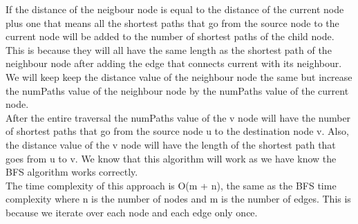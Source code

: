 \documentclass[12pt]{article}
\begin{document}
If the distance of the neigbour node is equal to the distance of the current node plus one that means all the shortest paths that go from the source node to the current node will be added to the number of shortest paths of the child node. This is because they will all have the same length as the shortest path of the neighbour node after adding the edge that connects current with its neighbour. We will keep keep the distance value of the neighbour node the same but increase the numPaths value of the neighbour node by the numPaths value of the current node.\\

After the entire traversal the numPaths value of the v node will have the number of shortest paths that go from the source node u to the destination node v. Also, the distance value of the v node will have the length of the shortest path that goes from u to v. We know that this algorithm will work as we have know the BFS algorithm works correctly.\\

The time complexity of this approach is O(m + n), the same as the BFS time complexity where n is the number of nodes and m is the number of edges. This is because we iterate over each node and each edge only once.\\
\end{document}
